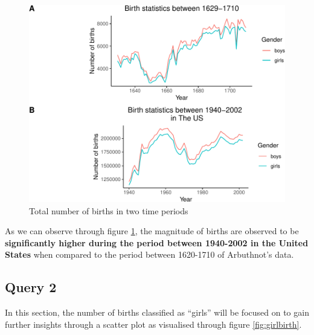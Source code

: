 \documentclass[11pt,a4paper,]{article}
\begin{document}
\begin{figure}

{\centering \includegraphics{Arindom_Baruah_32779267_files/figure-latex/figbirth-1} 

}

\caption{Total number of births in two time periods}\label{fig:figbirth}
\end{figure}

\normalsize

As we can observe through figure \ref{fig:figbirth}, the magnitude of births are observed to be \textbf{significantly higher during the period between 1940-2002 in the United States} when compared to the period between 1620-1710 of Arbuthnot's data.

\hypertarget{query-2}{%
\subsection{Query 2}\label{query-2}}

In this section, the number of births classified as ``girls'' will be focused on to gain further insights through a scatter plot as visualised through figure \ref{fig:girlbirth}.

\tiny
\end{document}
